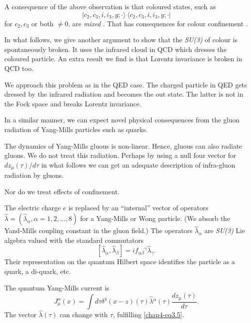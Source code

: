 A consequence of the above observation is that coloured states, such as
\begin{equation}
|c_2, c_3, i, i_3, y; \cdot \rangle ~ \langle c_2, c_3, i, i_3, y; \cdot | \label{chap4-eq3.4}
\end{equation}
for $c_2, c_3$ or both $\neq 0$, are \textit{mixed} \cite{chap4-key4}. That has consequences for colour confinement \cite{chap4-key4}.

In what follows, we give another argument to show that the \textit{SU(3)} of colour is spontaneously broken. It uses the infrared cloud in QCD which dresses the coloured particle. An extra result we find is that Lorentz invariance is broken in QCD too.

We approach this problem as in the QED case. The charged particle in QED gets dressed by the infrared radiation and becomes the out state. The latter is not in the Fock space and breaks Lorentz invariance.

In a similar manner, we can expect novel physical consequences from the gluon radiation of Yang-Mills particles such as quarks.

The dynamics of Yang-Mills gluous is non-linear. Hence, gluous can also radiate gluons. We do not treat this radiation. Perhaps by using a null four vector for $dz_\mu (\tau)/d \tau $ in what follows we can get an adequate description of infra-gluon radiation by gluons.

Nor do we treat effects of confinement.

The electric charge $e$ is replaced by an ``internal'' vector of operators $\hat{\lambda}= (\hat{\lambda}_\alpha, \alpha = 1, 2, \ldots , 8)$ for a Yang-Mills or Wong \cite{chap4-key11} particle. (We absorb the Yand-Mills coupling constant in the gluon field.) The operators $\hat{\lambda}_{\alpha}$ are \textit{SU(3)} Lie algebra valued with the standard commutators
\begin{equation}
\left[ \hat{\lambda}_\alpha, \hat{\lambda}_\beta \right] = if_{\alpha \beta} {}^\gamma \hat{\lambda}_\gamma. \label{chap4-eq3.5}
\end{equation}
Their representation on the quantum Hilbert space identifies the particle as a quark, a di-quark, etc.

The quantum Yang-Mills current is
\begin{equation}
J_\mu^\alpha (x) = \int d \tau \delta^4 (x -z) (\tau) \hat{\lambda} {}^\alpha (\tau) \frac{dz_\mu (\tau)}{d \tau}. \label{chap4-eq3.6}
\end{equation}
The vector $\hat{\lambda} (\tau)$ can change with $\tau$, fulfilling \eqref{chap4-eq3.5}.

